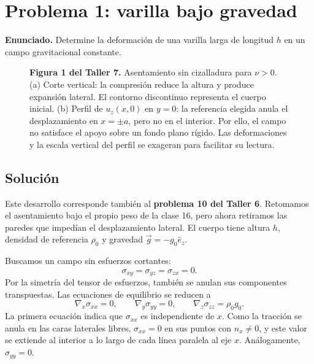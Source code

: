 \documentclass[a4paper]{article}
\begin{document}
\tableofcontents

\section{Problema 1: varilla bajo gravedad}

\textbf{Enunciado.} Determine la deformación de una varilla larga de longitud $h$ en un campo gravitacional constante.

\begin{figure}[H]
\centering

\par\medskip
\begin{minipage}{\textwidth}
\textbf{Figura 1 del Taller 7.} Asentamiento sin cizalladura para $\nu>0$. (a) Corte vertical: la compresión reduce la altura y produce expansión lateral. El contorno discontinuo representa el cuerpo inicial. (b) Perfil de $u_z(x,0)$ en $y=0$: la referencia elegida anula el desplazamiento en $x=\pm a$, pero no en el interior. Por ello, el campo no satisface el apoyo sobre un fondo plano rígido. Las deformaciones y la escala vertical del perfil se exageran para facilitar su lectura.
\end{minipage}
\end{figure}

\subsection{Solución}

Este desarrollo corresponde también al \textbf{problema 10 del Taller 6}. Retomamos el asentamiento bajo el propio peso de la clase 16, pero ahora retiramos las paredes que impedían el desplazamiento lateral. El cuerpo tiene altura $h$, densidad de referencia $\rho_0$ y gravedad $\vec g=-g_0\hat e_z$.

Buscamos un campo sin esfuerzos cortantes:
\[
\sigma_{xy}=\sigma_{yz}=\sigma_{zx}=0.
\]
Por la simetría del tensor de esfuerzos, también se anulan sus componentes transpuestas. Las ecuaciones de equilibrio se reducen a
\[
\nabla_x\sigma_{xx}=0,
\qquad
\nabla_y\sigma_{yy}=0,
\qquad
\nabla_z\sigma_{zz}=\rho_0g_0.
\]
La primera ecuación indica que $\sigma_{xx}$ es independiente de $x$. Como la tracción se anula en las caras laterales libres, $\sigma_{xx}=0$ en sus puntos con $n_x\ne0$, y este valor se extiende al interior a lo largo de cada línea paralela al eje $x$. Análogamente, $\sigma_{yy}=0$.
\end{document}
